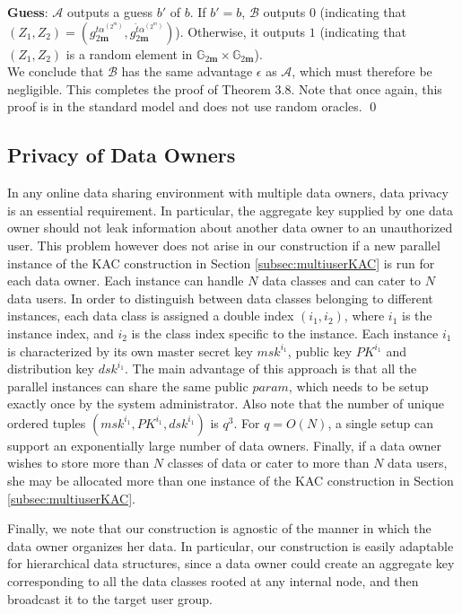\noindent \textbf{Guess}: $\mathcal{A}$ outputs a guess $b'$ of $b$. If $b' = b$, $\mathcal{B}$ outputs $0$ (indicating that $(Z_1,Z_2)=\left(g^{t\alpha^{(2^m)}}_{2\mathbf{m}},g^{\hat{t}\alpha^{(2^m)}}_{2\mathbf{m}}\right)$). Otherwise, it outputs $1$ (indicating that $(Z_1,Z_2)$ is a random element in $\mathbb{G}_{2\mathbf{m}}\times\mathbb{G}_{2\mathbf{m}}$).\\ 

\noindent We conclude that $\mathcal{B}$ has the same advantage $\epsilon$ as $\mathcal{A}$, which must therefore be negligible. This completes the proof of Theorem 3.8. Note that once again, this proof is in the standard model and does not use random oracles. \hfill\qed

\subsection{Privacy of Data Owners}
\label{subsec:multiownerKAC}

In any online data sharing environment with multiple data owners, data privacy is an essential requirement. In particular, the aggregate key supplied by one data owner should not leak information about another data owner to an unauthorized user. This problem however does not arise in our construction if a new parallel instance of the KAC construction in Section \ref{subsec:multiuserKAC}  is run for each data owner. Each instance can handle $N$ data classes and can cater to $N$ data users. In order to distinguish between data classes belonging to different instances, each data class is assigned a double index $(i_1,i_2)$, where $i_1$ is the instance index, and $i_2$ is the class index specific to the instance. Each instance $i_1$ is characterized by its own master secret key $msk^{i_1}$, public key $PK^{i_1}$ and distribution key $dsk^{i_1}$. The main advantage of this approach is that all the parallel instances can share the same public $param$, which needs to be setup exactly once by the system administrator. Also note that the number of unique ordered tuples $\left(msk^{i_1},PK^{i_1},dsk^{i_1}\right)$ is $q^3$. For $q=O(N)$, a single setup can support an exponentially large number of data owners. Finally, if a data owner wishes to store more than $N$ classes of data or cater to more than $N$ data users, she may be allocated more than one instance of the KAC construction in Section \ref{subsec:multiuserKAC}.

Finally, we note that our construction is agnostic of the manner in which the data owner organizes her data. In particular, our construction is easily adaptable for hierarchical data structures, since a data owner could create an aggregate key corresponding to all the data classes rooted at any internal node, and then broadcast it to the target user group.

